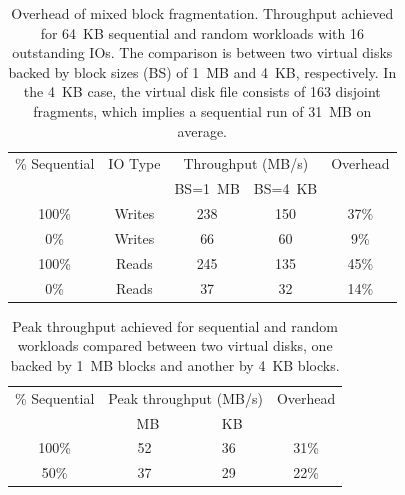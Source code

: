 \iftrue
\begin{table}
  \small
  \addtolength{\tabcolsep}{-2pt}
  \centering
  \begin{tabular}{|c|c|c|c|c|}
    \hline
    \% Sequential & IO Type & \multicolumn{2}{|c|}{Throughput (MB/s)} & Overhead \\
    & & \parbox[t]{1.15cm}{\centering BS=1~MB} & \parbox[t]{1.15cm}{\centering BS=4~KB} & \\
    \hline\hline
    100\% & Writes & 238 & 150  & 37\% \\

    0\% & Writes & 66 &  60 & 9\% \\

    100\% & Reads & 245 & 135 & 45\% \\

    0\% & Reads & 37  & 32 & 14\% \\
 \hline
\end{tabular}
\caption{Overhead of mixed block
    fragmentation. Throughput achieved for 64~KB sequential and random
    workloads with 16 outstanding IOs. The comparison is between two
    virtual disks backed by block sizes (BS) of 1~MB and 4~KB,
    respectively. In the 4~KB case, the virtual disk file consists of
    163 disjoint fragments, which implies a sequential run of
    31~MB on average.}
\label{table:mixed-block-overhead}
\end{table}

\else

\begin{table}
  \small
  \addtolength{\tabcolsep}{-2pt}
  \centering
  \begin{tabular}{|c|c|c|c|}
    \hline
    \% Sequential & \multicolumn{2}{|c|}{Peak throughput (MB/s)} & Overhead \\
    & \parbox[t]{1.3cm}{~MB} & \parbox[t]{1.3cm}{~KB} & \\
    \hline\hline
    100\% & 52 & 36 & 31\% \\
    50\% & 37 & 29 & 22\% \\
    \hline
  \end{tabular}
    \caption{Peak throughput achieved for sequential and random
    workloads compared between two virtual disks, one backed by 1~MB
    blocks and another by 4~KB blocks.}
  \label{table:mixed-block-overhead}
\end{table}

